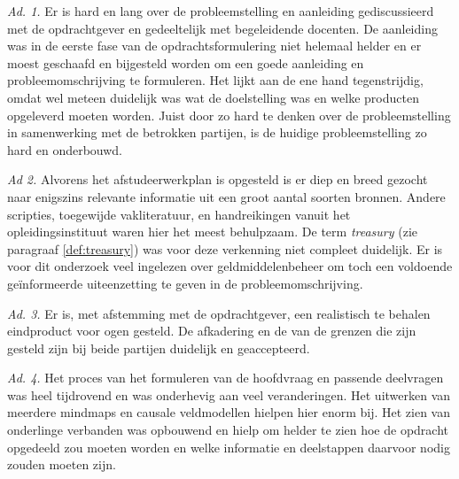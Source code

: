 \noindent
\textit{Ad. 1.} Er is hard en lang over de probleemstelling en aanleiding gediscussieerd met de opdrachtgever en gedeeltelijk met begeleidende docenten. De aanleiding was in de eerste fase van de opdrachtsformulering niet helemaal helder en er moest geschaafd en bijgesteld worden om een goede aanleiding en probleemomschrijving te formuleren. Het lijkt aan de ene hand tegenstrijdig, omdat wel meteen duidelijk was wat de doelstelling was en welke producten opgeleverd moeten worden. Juist door zo hard te denken over de probleemstelling in samenwerking met de betrokken partijen, is de huidige probleemstelling zo hard en onderbouwd. 

\bigskip
\noindent
\textit{Ad 2.} Alvorens het afstudeerwerkplan is opgesteld is er diep en breed gezocht naar enigszins relevante informatie uit een groot aantal soorten bronnen. Andere scripties, toegewijde vakliteratuur, en handreikingen vanuit het opleidingsinstituut waren hier het meest behulpzaam. De term \textit{treasury} (zie paragraaf \ref{def:treasury}) was voor deze verkenning niet compleet duidelijk. Er is voor dit onderzoek veel ingelezen over geldmiddelenbeheer om toch een voldoende geïnformeerde uiteenzetting te geven in de probleemomschrijving. 

\bigskip
\noindent
\textit{Ad. 3.} Er is, met afstemming met de opdrachtgever, een realistisch te behalen eindproduct voor ogen gesteld. De afkadering en de van de grenzen die zijn gesteld zijn bij beide partijen duidelijk en geaccepteerd.

\bigskip
\noindent
\textit{Ad. 4.} Het proces van het formuleren van de hoofdvraag en passende deelvragen was heel tijdrovend en was onderhevig aan veel veranderingen. Het uitwerken van meerdere mindmaps en causale veldmodellen hielpen hier enorm bij. Het zien van onderlinge verbanden was opbouwend en hielp om helder te zien hoe de opdracht opgedeeld zou moeten worden en welke informatie en deelstappen daarvoor nodig zouden moeten zijn.
\citep{competenties}